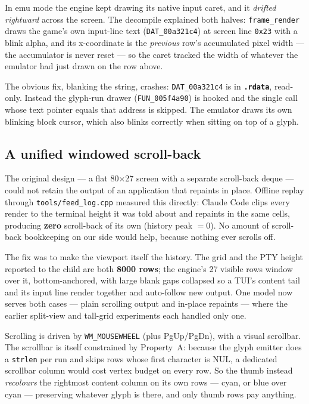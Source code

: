 \documentclass[11pt]{article}
\newcommand{\ic}[1]{\texttt{#1}}
\begin{document}
In emu mode the engine kept drawing its native input caret, and it \emph{drifted
rightward} across the screen. The decompile explained both halves: \ic{frame_render}
draws the game's own input-line text (\texttt{DAT_00a321c4}) at screen line \texttt{0x23}
with a blink alpha, and its x-coordinate is the \emph{previous} row's accumulated pixel
width --- the accumulator is never reset --- so the caret tracked the width of whatever
the emulator had just drawn on the row above.

The obvious fix, blanking the string, crashes: \texttt{DAT_00a321c4} is in
\textbf{\texttt{.rdata}}, read-only. Instead the glyph-run drawer
(\texttt{FUN_005f4a90}) is hooked and the single call whose text pointer equals that
address is skipped. The emulator draws its own blinking block cursor, which also blinks
correctly when sitting on top of a glyph.

\subsection{A unified windowed scroll-back}

The original design --- a flat 80$\times$27 screen with a separate scroll-back deque ---
could not retain the output of an application that repaints in place. Offline replay
through \texttt{tools/feed_log.cpp} measured this directly: Claude Code clips every
render to the terminal height it was told about and repaints in the same cells,
producing \textbf{zero} scroll-back of its own (history peak $=0$). No amount of
scroll-back bookkeeping on our side would help, because nothing ever scrolls off.

The fix was to make the viewport itself the history. The grid and the PTY height
reported to the child are both \textbf{8000 rows}; the engine's 27 visible rows window
over it, bottom-anchored, with large blank gaps collapsed so a TUI's content tail and
its input line render together and auto-follow new output. One model now serves both
cases --- plain scrolling output and in-place repaints --- where the earlier
split-view and tall-grid experiments each handled only one.

Scrolling is driven by \ic{WM_MOUSEWHEEL} (plus PgUp/PgDn), with a visual scrollbar.
The scrollbar is itself constrained by Property~A: because the glyph emitter does a
\ic{strlen} per run and skips rows whose first character is NUL, a dedicated scrollbar
column would cost vertex budget on every row. So the thumb instead \emph{recolours} the
rightmost content column on its own rows --- cyan, or blue over cyan --- preserving
whatever glyph is there, and only thumb rows pay anything.
\end{document}
